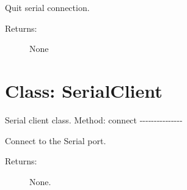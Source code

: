 Quit serial connection.

\begin{description}
\item[Returns:]
None
\end{description}

\hypertarget{qconnectbase-serialclient-serial-base-class-serialclient-59}{%
\section{Class: SerialClient}\label{qconnectbase-serialclient-serial-base-class-serialclient-59}}

\begin{Shaded}
\begin{Highlighting}[]
\end{Highlighting}
\end{Shaded}

Serial client class. Method: connect
-\/-\/-\/-\/-\/-\/-\/-\/-\/-\/-\/-\/-\/-\/-

Connect to the Serial port.

\begin{description}
\item[Returns:]
None.
\end{description}
